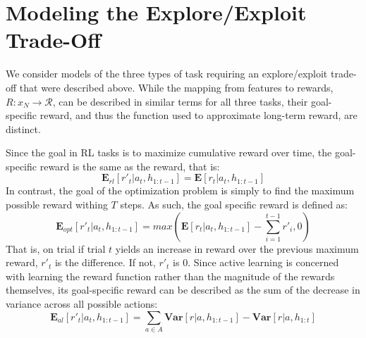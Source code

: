 \documentclass[10pt,letterpaper]{article}
\begin{document}
	\section{Modeling the Explore/Exploit Trade-Off}
	
	We consider models of the three types of task requiring an explore/exploit trade-off that were described above. While the mapping from features to rewards, $R: x_{N} \to \mathcal{R}$, can be described in similar terms for all three tasks, their goal-specific reward, and thus the function used to approximate long-term reward, are distinct.
	
	Since the goal in RL tasks is to maximize cumulative reward over time, the goal-specific reward is the same as the reward, that is:
	\begin{equation}
	\mathbf{E}_{rl}[r'_{t}|a_{t}, h_{1:t-1}] = \mathbf{E}[r_{t}|a_{t}, h_{1:t-1}]
	\end{equation}
	In contrast, the goal of the optimization problem is simply to find the maximum possible reward withing $T$ steps. As such, the goal specific reward is defined as:
	\begin{equation}
	\mathbf{E}_{opt}[r'_{t}|a_{t}, h_{1:t-1}] = max(\mathbf{E}[r_{t}|a_{t}, h_{1:t-1}] - \sum_{i=1}^{t-1}r'_{i}, 0)
	\end{equation}
	That is, on trial if trial $t$ yields an increase in reward over the previous maximum reward, $r'_{t}$ is the difference. If not, $r'_{t}$ is 0. Since active learning is concerned with learning the reward function rather than the magnitude of the rewards themselves, its goal-specific reward can be described as the sum of the decrease in variance across all possible actions:
	\begin{equation}
	\mathbf{E}_{al}[r'_{t}|a_{t}, h_{1:t-1}] = \sum_{a \in A} \mathbf{Var}[r|a,h_{1:t-1}] - \mathbf{Var}[r|a,h_{1:t}]
	\end{equation}
	
\end{document}
